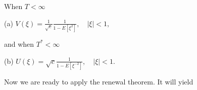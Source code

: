 When $T < \infty$

(a) $V(\xi) = \frac{1}{\sqrt{c}} \frac{1}{1 - E[\xi^2]}, \quad |\xi| < 1,$

and when $T^* < \infty$

(b) $U(\xi) = \sqrt{c} \frac{1}{1 - E[\xi^{-2}]}, \quad |\xi| < 1.$

Now we are ready to apply the renewal theorem. It will yield